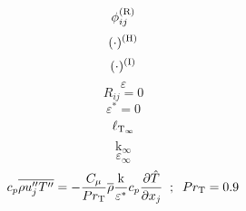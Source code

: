 \documentclass{article}
\begin{document}
\begin{equation}
\phi^{(\mathrm{\tiny R})}_{ij}
\end{equation}
\begin{equation}
(\cdot)^{(\mathrm{\tiny H})}
\end{equation}
\begin{equation}
(\cdot)^{(\mathrm{\tiny I})}
\end{equation}
\begin{equation}
\varepsilon
\end{equation}
\begin{equation}
R_{ij}=0
\end{equation}
\begin{equation}
\varepsilon^*=0
\end{equation}
\begin{equation}
\ell_{\mathrm{\tiny T}_\infty}
\end{equation}
\begin{equation}
\mathrm{k}_\infty
\end{equation}
\begin{equation}
\varepsilon_\infty
\end{equation}
\begin{equation}
c_p\overline{\rho u_j''T''} = -\frac{C_\mu}{Pr_\mathrm{\tiny T}}\overline{\rho}\frac{\mathrm{k}}{\varepsilon^*}c_p\frac{\partial\hat T}{\partial x_j}\;\; ; \;\;
Pr_\mathrm{\tiny T}=0.9
\end{equation}
\end{document}
